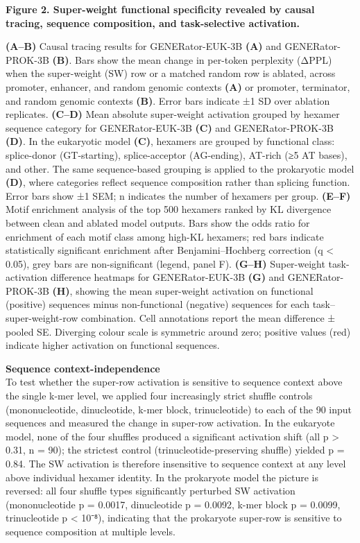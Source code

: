\documentclass[11pt]{article}
\begin{document}
\textbf{Figure 2. Super-weight functional specificity revealed by causal
tracing, sequence composition, and task-selective activation.}

\textbf{(A--B)} Causal tracing results for GENERator-EUK-3B \textbf{(A)}
and GENERator-PROK-3B \textbf{(B)}. Bars show the mean change in
per-token perplexity (ΔPPL) when the super-weight (SW) row or a matched
random row is ablated, across promoter, enhancer, and random genomic
contexts \textbf{(A)} or promoter, terminator, and random genomic
contexts \textbf{(B)}. Error bars indicate ±1 SD over ablation
replicates. \textbf{(C--D)} Mean absolute super-weight activation
grouped by hexamer sequence category for GENERator-EUK-3B \textbf{(C)}
and GENERator-PROK-3B \textbf{(D)}. In the eukaryotic model
\textbf{(C)}, hexamers are grouped by functional class: splice-donor
(GT-starting), splice-acceptor (AG-ending), AT-rich (≥5 AT bases), and
other. The same sequence-based grouping is applied to the prokaryotic
model \textbf{(D)}, where categories reflect sequence composition rather
than splicing function. Error bars show ±1 SEM; n indicates the number
of hexamers per group. \textbf{(E--F)} Motif enrichment analysis of the
top 500 hexamers ranked by KL divergence between clean and ablated model
outputs. Bars show the odds ratio for enrichment of each motif class
among high-KL hexamers; red bars indicate statistically significant
enrichment after Benjamini--Hochberg correction (q \textless{} 0.05),
grey bars are non-significant (legend, panel F). \textbf{(G--H)}
Super-weight task-activation difference heatmaps for GENERator-EUK-3B
\textbf{(G)} and GENERator-PROK-3B \textbf{(H)}, showing the mean
super-weight activation on functional (positive) sequences minus
non-functional (negative) sequences for each task--super-weight-row
combination. Cell annotations report the mean difference ± pooled SE.
Diverging colour scale is symmetric around zero; positive values (red)
indicate higher activation on functional sequences.

\textbf{Sequence context-independence}\\
To test whether the super-row activation is sensitive to sequence
context above the single k-mer level, we applied four increasingly
strict shuffle controls (mononucleotide, dinucleotide, k-mer block,
trinucleotide) to each of the 90 input sequences and measured the change
in super-row activation. In the eukaryote model, none of the four
shuffles produced a significant activation shift (all p \textgreater{}
0.31, n = 90); the strictest control (trinucleotide-preserving shuffle)
yielded p = 0.84. The SW activation is therefore insensitive to sequence
context at any level above individual hexamer identity. In the
prokaryote model the picture is reversed: all four shuffle types
significantly perturbed SW activation (mononucleotide p = 0.0017,
dinucleotide p = 0.0092, k-mer block p = 0.0099, trinucleotide p
\textless{} 10⁻⁸), indicating that the prokaryote super-row is sensitive
to sequence composition at multiple levels.
\end{document}

